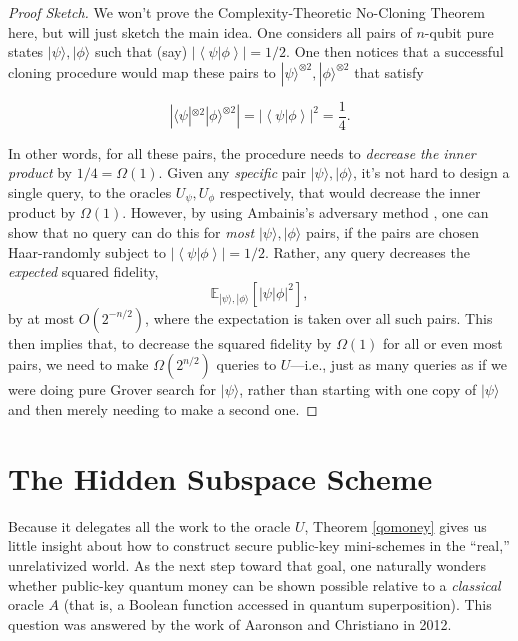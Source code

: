 \documentclass[11pt]{report}
\theoremstyle{plain}
\theoremstyle{definition}
\renewcommand{\bra}[1]{\langle#1|}
\renewcommand{\ket}[1]{|#1\rangle}
\begin{document}
\begin{proof}[Proof Sketch]
We won't prove the Complexity-Theoretic No-Cloning Theorem here, but will just sketch the main idea.  One considers all pairs of $n$-qubit pure states $\ket{\psi},\ket{\phi}$ such that (say) $\left| \left\langle \psi | \phi \right\rangle \right| = 1/2$.  One then notices that a successful cloning procedure would map these pairs to $\ket{\psi}^{\otimes 2},\ket{\phi}^{\otimes 2}$ that satisfy

$$ \left| \bra{\psi}^{\otimes 2} \ket{\phi}^{\otimes 2} \right| = \left| \left\langle \psi | \phi \right\rangle \right|^2 = \frac{1}{4}. $$

In other words, for all these pairs, the procedure needs to {\em decrease the inner product} by $1/4 = \Omega(1)$.  Given any {\em specific} pair $\ket{\psi},\ket{\phi}$, it's not hard to design a single query, to the oracles $U_{\psi},U_{\phi}$ respectively, that would decrease the inner product by $\Omega(1)$.  However, by using Ambainis's adversary method \cite{ambainis}, one can show that no query can do this for {\em most} $\ket{\psi},\ket{\phi}$ pairs, if the pairs are chosen Haar-randomly subject to $\left| \left\langle \psi | \phi \right\rangle \right| = 1/2$.  Rather, any query decreases the {\em expected} squared fidelity,
$$ \mathbb{E}_{\ket{\psi},\ket{\phi}}\left[ \left| \psi | \phi \right|^2 \right], $$
by at most $O(2^{-n/2})$, where the expectation is taken over all such pairs.  This then implies that, to decrease the squared fidelity by $\Omega(1)$ for all or even most pairs, we need to make $\Omega(2^{n/2})$ queries to $U$---i.e., just as many queries as if we were doing pure Grover search for $\ket{\psi}$, rather than starting with one copy of $\ket{\psi}$ and then merely needing to make a second one.
\end{proof}

\section{The Hidden Subspace Scheme}

Because it delegates all the work to the oracle $U$, Theorem \ref{qomoney} gives us little insight about how to construct secure public-key mini-schemes in the ``real,'' unrelativized world.
As the next step toward that goal, one naturally wonders whether public-key quantum money can be shown possible relative to a {\em classical} oracle $A$ (that is, a Boolean function accessed in quantum superposition).  This question was answered by the work of Aaronson and Christiano \cite{achristiano} in 2012.
\end{document}
